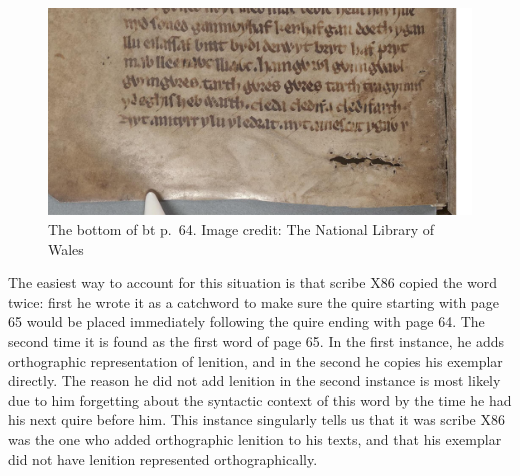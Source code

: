 \begin{figure}[h]
    \centering
    \includegraphics[width=\textwidth]{3orth/images/canvas.png}
    \caption[The bottom of \gls{bt} p.~64]{The bottom of \gls{bt} p.~64. Image credit: The National Library of Wales}
    \label{fig:p64}
\end{figure}

The easiest way to account for this situation is that scribe X86  copied the word  twice: first he wrote it as a catchword to make sure the quire starting with page 65 would be placed immediately following the quire ending with page 64. The second time it is found as the first word of page 65. In the first instance, he adds orthographic representation of lenition, and in the second he copies his exemplar directly. The reason he did not add lenition in the second instance is most likely due to him forgetting about the syntactic context of this word by the time he had his next quire before him. This instance singularly tells us that it was scribe X86 was the one who added orthographic lenition to his texts, and that his exemplar did not have lenition represented orthographically. 

